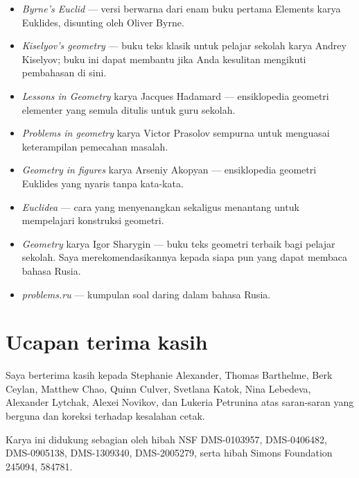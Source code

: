 \begin{itemize}
\item {}\emph{Byrne's Euclid} \cite{byrne} --- versi berwarna dari enam buku pertama Elements karya Euklides, disunting oleh Oliver Byrne.

\item {}\emph{Kiselyov's geometry} \cite{kiselev} ---
buku teks klasik untuk pelajar sekolah karya Andrey Kiselyov; buku ini dapat membantu jika Anda kesulitan mengikuti pembahasan di sini.

\item {}\emph{Lessons in Geometry} karya Jacques Hadamard \cite{hadamard} --- ensiklopedia geometri elementer yang semula ditulis untuk guru sekolah.



\item {}\emph{Problems in geometry} karya Victor Prasolov \cite{prasolov} sempurna untuk menguasai keterampilan pemecahan masalah.

\item {}\emph{Geometry in figures} karya Arseniy Akopyan \cite{akopyan} --- ensiklopedia geometri Euklides yang nyaris tanpa kata-kata.

\item {}\emph{Euclidea} \cite{euclidea} --- cara yang menyenangkan sekaligus menantang untuk mempelajari konstruksi geometri.
 
\item {}\emph{Geometry} karya Igor Sharygin \cite{sharygin} --- buku teks geometri terbaik bagi pelajar sekolah.
Saya merekomendasikannya kepada siapa pun yang dapat membaca bahasa Rusia.

\item {}\emph{problems.ru} \cite{zadachi} --- kumpulan soal daring dalam bahasa Rusia.

\end{itemize}

\section{Ucapan terima kasih}

{\sloppy

Saya berterima kasih kepada
Stephanie Alexander,
Thomas Barthelme,
Berk Ceylan,
Matthew Chao, 
Quinn Culver,
Svetlana Katok, 
Nina Lebedeva,
Alexander Lytchak,
Alexei Novikov,
dan Lukeria Petrunina
atas saran-saran yang berguna dan koreksi terhadap kesalahan cetak.

Karya ini didukung sebagian oleh
hibah NSF
DMS-0103957,
DMS-0406482,
DMS-0905138,
DMS-1309340,
DMS-2005279,
serta hibah Simons Foundation
245094, 584781.

}

